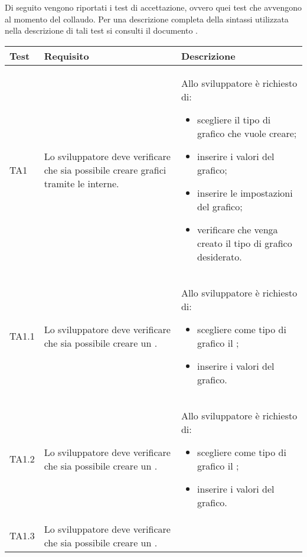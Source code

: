 	Di seguito vengono riportati i test di accettazione, ovvero quei test che avvengono al momento del collaudo. Per una descrizione completa della sintassi utilizzata nella descrizione di tali test si consulti il documento .

	\begin{longtabu}{| X[0.5] | X | X |}

	\hline
	\rowfont{\bf}
	Test &
	Requisito &
	Descrizione \\
	\hline \endhead

	TA1 & Lo sviluppatore deve verificare che sia possibile creare grafici tramite le  interne.
	 
		& Allo sviluppatore è richiesto di:
		\begin{itemize}
			\item scegliere il tipo di grafico che vuole creare;
			\item inserire i valori del grafico;
			\item inserire le impostazioni del grafico;
			\item verificare che venga creato il tipo di grafico desiderato.
		\end{itemize}
\\ \hline

	TA1.1 & Lo sviluppatore deve verificare che sia possibile creare un .

		& Allo sviluppatore è richiesto di:
		\begin{itemize}
			\item scegliere come tipo di grafico il ;
			\item inserire i valori del grafico.
		\end{itemize}
\\ \hline

	TA1.2 & Lo sviluppatore deve verificare che sia possibile creare un .

		& Allo sviluppatore è richiesto di:
		\begin{itemize}
			\item scegliere come tipo di grafico il ;
			\item inserire i valori del grafico.
		\end{itemize}
\\ \hline

	TA1.3 & Lo sviluppatore deve verificare che sia possibile creare un .


\end{longtabu}
